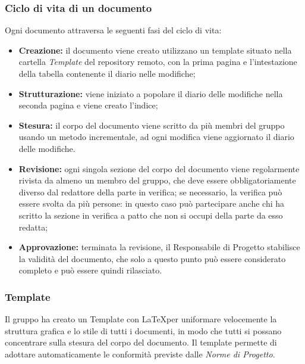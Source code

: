         \subsubsection{Ciclo di vita di un documento}
        Ogni documento attraversa le seguenti fasi del ciclo di vita:
        \begin{itemize}
            \item \textbf{Creazione:} il documento viene creato utilizzano un template situato nella cartella \textit{Template} del repository remoto, con la prima pagina e l'intestazione della tabella contenente il diario nelle modifiche;
            \item \textbf{Strutturazione:} viene iniziato a popolare il diario delle modifiche nella seconda pagina e viene creato l'indice;
            \item \textbf{Stesura:} il corpo del documento viene scritto da più membri del gruppo usando un metodo incrementale, ad ogni modifica viene aggiornato il diario delle modifiche.
            \item \textbf{Revisione:} ogni singola sezione del corpo del documento viene regolarmente rivista da almeno un membro del gruppo, che deve essere obbligatoriamente diverso dal redattore della parte in verifica; se necessario, la verifica può essere svolta da più persone: in questo caso può partecipare anche chi ha scritto la sezione in verifica a patto che non si occupi della parte da esso redatta;
            \item \textbf{Approvazione:} terminata la revisione, il Responsabile di Progetto stabilisce la validità del documento, che solo a questo punto può essere considerato completo e può essere quindi rilasciato.
        \end{itemize}
        \subsubsection{Template}
        Il gruppo ha creato un Template con \LaTeX per uniformare velocemente la struttura grafica e lo stile di tutti i documenti, in modo che tutti si possano concentrare sulla stesura del corpo del documento. Il template permette di adottare automaticamente le conformità previste dalle \textit{Norme di Progetto}.
